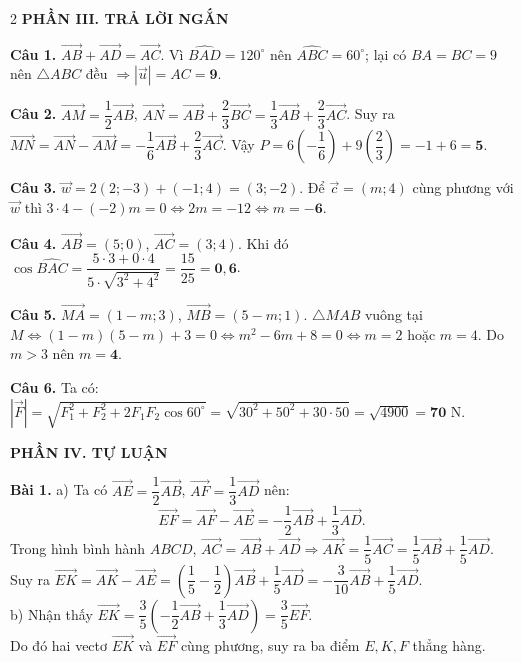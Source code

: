 \documentclass[10pt,a4paper]{article}
\begin{document}
\begin{multicols}{2}
\textbf{\color{accent}PHẦN III. TRẢ LỜI NGẮN}

\textbf{Câu 1.} $\vec{AB} + \vec{AD} = \vec{AC}$. Vì $\widehat{BAD} = 120^\circ$ nên $\widehat{ABC} = 60^\circ$; lại có $BA = BC = 9$ nên $\triangle ABC$ đều $\Rightarrow |\vec{u}| = AC = \mathbf{9}$.

\textbf{Câu 2.} $\vec{AM} = \dfrac{1}{2}\vec{AB}$, $\vec{AN} = \vec{AB} + \dfrac{2}{3}\vec{BC} = \dfrac{1}{3}\vec{AB} + \dfrac{2}{3}\vec{AC}$. Suy ra $\vec{MN} = \vec{AN} - \vec{AM} = -\dfrac{1}{6}\vec{AB} + \dfrac{2}{3}\vec{AC}$. Vậy $P = 6\left(-\dfrac{1}{6}\right) + 9\left(\dfrac{2}{3}\right) = -1 + 6 = \mathbf{5}$.

\textbf{Câu 3.} $\vec{w} = 2(2; -3) + (-1; 4) = (3; -2)$. Để $\vec{c} = (m; 4)$ cùng phương với $\vec{w}$ thì $3 \cdot 4 - (-2)m = 0 \Leftrightarrow 2m = -12 \Leftrightarrow m = \mathbf{-6}$.

\textbf{Câu 4.} $\vec{AB} = (5; 0)$, $\vec{AC} = (3; 4)$. Khi đó $\cos\widehat{BAC} = \dfrac{5 \cdot 3 + 0 \cdot 4}{5 \cdot \sqrt{3^2+4^2}} = \dfrac{15}{25} = \mathbf{0{,}6}$.

\textbf{Câu 5.} $\vec{MA} = (1-m; 3)$, $\vec{MB} = (5-m; 1)$. $\triangle MAB$ vuông tại $M \Leftrightarrow (1-m)(5-m) + 3 = 0 \Leftrightarrow m^2 - 6m + 8 = 0 \Leftrightarrow m = 2$ hoặc $m = 4$. Do $m > 3$ nên $m = \mathbf{4}$.

\textbf{Câu 6.} Ta có:\\
$|\vec{F}| = \sqrt{F_1^2 + F_2^2 + 2F_1 F_2 \cos 60^\circ} = \sqrt{30^2 + 50^2 + 30 \cdot 50} = \sqrt{4900} = \mathbf{70}\text{ N}$.

\textbf{\color{accent}PHẦN IV. TỰ LUẬN}

\textbf{Bài 1.}
a) Ta có $\vec{AE} = \dfrac{1}{2}\vec{AB}$, $\vec{AF} = \dfrac{1}{3}\vec{AD}$ nên:
$$\vec{EF} = \vec{AF} - \vec{AE} = -\dfrac{1}{2}\vec{AB} + \dfrac{1}{3}\vec{AD}.$$
Trong hình bình hành $ABCD$, $\vec{AC} = \vec{AB} + \vec{AD} \Rightarrow \vec{AK} = \dfrac{1}{5}\vec{AC} = \dfrac{1}{5}\vec{AB} + \dfrac{1}{5}\vec{AD}$.\\
Suy ra $\vec{EK} = \vec{AK} - \vec{AE} = \left(\dfrac{1}{5} - \dfrac{1}{2}\right)\vec{AB} + \dfrac{1}{5}\vec{AD} = -\dfrac{3}{10}\vec{AB} + \dfrac{1}{5}\vec{AD}$.\\
b) Nhận thấy $\vec{EK} = \dfrac{3}{5}\left(-\dfrac{1}{2}\vec{AB} + \dfrac{1}{3}\vec{AD}\right) = \dfrac{3}{5}\vec{EF}$.\\
Do đó hai vectơ $\vec{EK}$ và $\vec{EF}$ cùng phương, suy ra ba điểm $E, K, F$ thẳng hàng.


\end{multicols}
\end{document}
